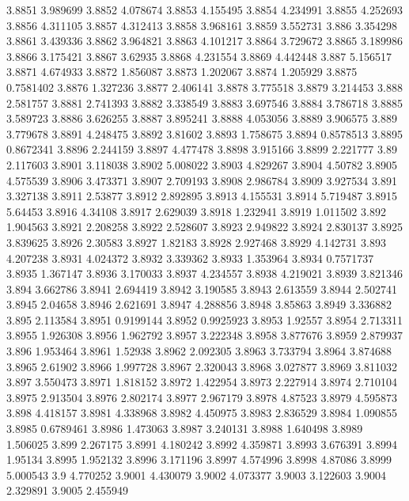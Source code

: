 3.8851  3.989699
3.8852  4.078674
3.8853  4.155495
3.8854  4.234991
3.8855  4.252693
3.8856  4.311105
3.8857  4.312413
3.8858  3.968161
3.8859  3.552731
3.886  3.354298
3.8861  3.439336
3.8862  3.964821
3.8863  4.101217
3.8864  3.729672
3.8865  3.189986
3.8866  3.175421
3.8867  3.62935
3.8868  4.231554
3.8869  4.442448
3.887  5.156517
3.8871  4.674933
3.8872  1.856087
3.8873  1.202067
3.8874  1.205929
3.8875  0.7581402
3.8876  1.327236
3.8877  2.406141
3.8878  3.775518
3.8879  3.214453
3.888  2.581757
3.8881  2.741393
3.8882  3.338549
3.8883  3.697546
3.8884  3.786718
3.8885  3.589723
3.8886  3.626255
3.8887  3.895241
3.8888  4.053056
3.8889  3.906575
3.889  3.779678
3.8891  4.248475
3.8892  3.81602
3.8893  1.758675
3.8894  0.8578513
3.8895  0.8672341
3.8896  2.244159
3.8897  4.477478
3.8898  3.915166
3.8899  2.221777
3.89  2.117603
3.8901  3.118038
3.8902  5.008022
3.8903  4.829267
3.8904  4.50782
3.8905  4.575539
3.8906  3.473371
3.8907  2.709193
3.8908  2.986784
3.8909  3.927534
3.891  3.327138
3.8911  2.53877
3.8912  2.892895
3.8913  4.155531
3.8914  5.719487
3.8915  5.64453
3.8916  4.34108
3.8917  2.629039
3.8918  1.232941
3.8919  1.011502
3.892  1.904563
3.8921  2.208258
3.8922  2.528607
3.8923  2.949822
3.8924  2.830137
3.8925  3.839625
3.8926  2.30583
3.8927  1.82183
3.8928  2.927468
3.8929  4.142731
3.893  4.207238
3.8931  4.024372
3.8932  3.339362
3.8933  1.353964
3.8934  0.7571737
3.8935  1.367147
3.8936  3.170033
3.8937  4.234557
3.8938  4.219021
3.8939  3.821346
3.894  3.662786
3.8941  2.694419
3.8942  3.190585
3.8943  2.613559
3.8944  2.502741
3.8945  2.04658
3.8946  2.621691
3.8947  4.288856
3.8948  3.85863
3.8949  3.336882
3.895  2.113584
3.8951  0.9199144
3.8952  0.9925923
3.8953  1.92557
3.8954  2.713311
3.8955  1.926308
3.8956  1.962792
3.8957  3.222348
3.8958  3.877676
3.8959  2.879937
3.896  1.953464
3.8961  1.52938
3.8962  2.092305
3.8963  3.733794
3.8964  3.874688
3.8965  2.61902
3.8966  1.997728
3.8967  2.320043
3.8968  3.027877
3.8969  3.811032
3.897  3.550473
3.8971  1.818152
3.8972  1.422954
3.8973  2.227914
3.8974  2.710104
3.8975  2.913504
3.8976  2.802174
3.8977  2.967179
3.8978  4.87523
3.8979  4.595873
3.898  4.418157
3.8981  4.338968
3.8982  4.450975
3.8983  2.836529
3.8984  1.090855
3.8985  0.6789461
3.8986  1.473063
3.8987  3.240131
3.8988  1.640498
3.8989  1.506025
3.899  2.267175
3.8991  4.180242
3.8992  4.359871
3.8993  3.676391
3.8994  1.95134
3.8995  1.952132
3.8996  3.171196
3.8997  4.574996
3.8998  4.87086
3.8999  5.000543
3.9  4.770252
3.9001  4.430079
3.9002  4.073377
3.9003  3.122603
3.9004  2.329891
3.9005  2.455949
